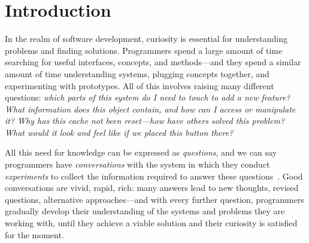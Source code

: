 

\chapter{Introduction}
\label{cha:introduction}

In the realm of software development, curiosity is essential for understanding problems and finding solutions.
Programmers spend a large amount of time searching for useful interfaces, concepts, and methods---and they spend a similar amount of time understanding systems, plugging concepts together, and experimenting with prototypes.
All of this involves raising many different questions:
\emph{%
	which parts of this system do I need to touch to add a new feature?
	What information does this object contain, and how can I access or manipulate it?
	Why has this cache not been reset---how have others solved this problem?
	What would it look and feel like if we placed this button there?
}

All this need for knowledge can be expressed as \emph{questions}, and we can say programmers have \emph{conversations} with the system in which they conduct \emph{experiments} to collect the information required to answer these questions~\cite{taeumel2022pattern}.
Good conversations are vivid, rapid, rich: many answers lead to new thoughts, revised questions, alternative approaches---and with every further question, programmers gradually develop their understanding of the systems and problems they are working with, until they achieve a viable solution and their curiosity is satisfied for the moment.

